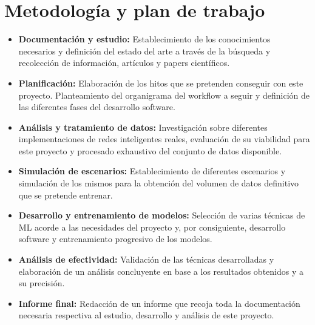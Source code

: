 \section{Metodología y plan de trabajo}
\vspace{0.3cm}
\begin{itemize}

\item \textbf{Documentación y estudio:} Establecimiento de los conocimientos necesarios y definición del estado del arte a través de la búsqueda y recolección de información, artículos y papers científicos.  

\item \textbf{Planificación:} Elaboración de los hitos que se pretenden conseguir con este proyecto. Planteamiento del organigrama del workflow a seguir y definición de las diferentes fases del desarrollo software.

\item \textbf{Análisis y tratamiento de datos:} Investigación sobre diferentes implementaciones de redes inteligentes reales, evaluación de su viabilidad para este proyecto y procesado exhaustivo del conjunto de datos disponible.

\item \textbf{Simulación de escenarios:} Establecimiento de diferentes escenarios y simulación de los mismos para la obtención del volumen de datos definitivo que se pretende entrenar.

\item \textbf{Desarrollo y entrenamiento de modelos:} Selección de varias técnicas de ML acorde a las necesidades del proyecto y, por consiguiente, desarrollo software y entrenamiento progresivo de los modelos.

\item \textbf{Análisis de efectividad:} Validación de las técnicas desarrolladas y elaboración de un análisis concluyente en base a los resultados obtenidos y a su precisión. 

\item \textbf{Informe final:} Redacción de un informe que recoja toda la documentación necesaria respectiva al estudio, desarrollo y análisis de este proyecto.

\end{itemize}


